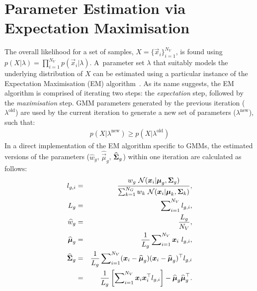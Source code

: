\section{\small Parameter Estimation via Expectation Maximisation}
\label{sec:param_em}

\noindent
The overall likelihood for a set of samples, $X=\{\Vec{x}_i\}_{i=1}^{N_V}$,
is found using $p(X | \lambda) = \prod\nolimits_{i=1}^{N_V} p(\Vec{x}_i | \lambda)$.
A~parameter set $\lambda$ that suitably models the underlying distribution of $X$ can be estimated using a particular instance of the Expectation Maximisation (EM) algorithm~\cite{Dempster77, McLachlan-2008, Moon96, Redner84}.
As its name suggests, the EM algorithm is comprised of iterating two steps: the {\it expectation} step, followed by the {\it maximisation} step.
GMM parameters generated by the previous iteration ($\lambda^{\textrm{old}}$) are used
by the current iteration to generate a new set of parameters ($\lambda^{\textrm{new}}$), such that:
%
\begin{eqnarray}
	p(X|\lambda^{\textrm{new}}) \geq p(X|\lambda^{\textrm{old}})
\end{eqnarray}
%
In a direct implementation of the EM algorithm specific to GMMs,
the estimated versions of the parameters ($\widehat{w}_g$, $\widehat{\Vec{\mu}}_g$, $\widehat{{\boldsymbol{\Sigma}}}_g$)
within one iteration are calculated as follows:
%
\begin{eqnarray}
  l_{g,i}                  & = & \frac{w_g ~ {{\mathcal{N}}}( \Vec{x}_i | \Vec{\mu}_g, \Mat{\Sigma}_g )}{\sum\nolimits_{k=1}^{N_G} w_k ~ {{\mathcal{N}}}( \Vec{x}_i | \Vec{\mu}_k, \Mat{\Sigma}_k )}, \label{eqn:aposteriori} \\
  L_g                      & = & \sum\nolimits_{i=1}^{N_V} l_{g,i}, \\
  \widehat{w}_g            & = & \frac{L_g}{N_V},  \label{eqn:em_weight} \\
  \widehat{\Vec{\mu}}_g    & = & \frac{1}{L_g} \sum\nolimits_{i=1}^{N_V} \Vec{x}_i ~ l_{g,i}  \label{eqn:em_mean}, \\
  \widehat{\Mat{\Sigma}}_g & = & \frac{1}{L_g} \sum\nolimits_{i=1}^{N_V} (\Vec{x}_i - \widehat{\Vec{\mu}}_g)(\Vec{x}_i - \widehat{\Vec{\mu}}_g)^\top l_{g,i} \label{eqn:em_cov} \\
                           & = &  \frac{1}{L_g} \left[ \sum\nolimits_{i=1}^{N_V} \Vec{x}_i \Vec{x}_i^\top l_{g,i} \right] - \widehat{\Vec{\mu}}_g \widehat{\Vec{\mu}}_g^\top.
\end{eqnarray}

